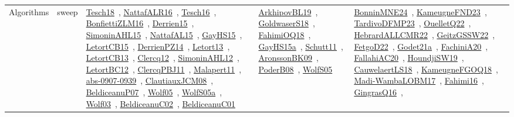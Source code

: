 {\begin{longtable}{lp{3cm}>{\raggedright\arraybackslash}p{6cm}>{\raggedright\arraybackslash}p{6cm}>{\raggedright\arraybackslash}p{8cm}}
\index{sweep}\index{Algorithms!sweep}Algorithms & sweep & \href{../works/Tesch18.pdf}{Tesch18}~\cite{Tesch18}, \href{../works/NattafALR16.pdf}{NattafALR16}~\cite{NattafALR16}, \href{../works/Tesch16.pdf}{Tesch16}~\cite{Tesch16}, \href{../works/BonfiettiZLM16.pdf}{BonfiettiZLM16}~\cite{BonfiettiZLM16}, \href{../works/Derrien15.pdf}{Derrien15}~\cite{Derrien15}, \href{../works/SimoninAHL15.pdf}{SimoninAHL15}~\cite{SimoninAHL15}, \href{../works/NattafAL15.pdf}{NattafAL15}~\cite{NattafAL15}, \href{../works/GayHS15.pdf}{GayHS15}~\cite{GayHS15}, \href{../works/LetortCB15.pdf}{LetortCB15}~\cite{LetortCB15}, \href{../works/DerrienPZ14.pdf}{DerrienPZ14}~\cite{DerrienPZ14}, \href{../works/Letort13.pdf}{Letort13}~\cite{Letort13}, \href{../works/LetortCB13.pdf}{LetortCB13}~\cite{LetortCB13}, \href{../works/Clercq12.pdf}{Clercq12}~\cite{Clercq12}, \href{../works/SimoninAHL12.pdf}{SimoninAHL12}~\cite{SimoninAHL12}, \href{../works/LetortBC12.pdf}{LetortBC12}~\cite{LetortBC12}, \href{../works/ClercqPBJ11.pdf}{ClercqPBJ11}~\cite{ClercqPBJ11}, \href{../works/Malapert11.pdf}{Malapert11}~\cite{Malapert11}, \href{../works/abs-0907-0939.pdf}{abs-0907-0939}~\cite{abs-0907-0939}, \href{../works/ClautiauxJCM08.pdf}{ClautiauxJCM08}~\cite{ClautiauxJCM08}, \href{../works/BeldiceanuP07.pdf}{BeldiceanuP07}~\cite{BeldiceanuP07}, \href{../works/Wolf05.pdf}{Wolf05}~\cite{Wolf05}, \href{../works/WolfS05a.pdf}{WolfS05a}~\cite{WolfS05a}, \href{../works/Wolf03.pdf}{Wolf03}~\cite{Wolf03}, \href{../works/BeldiceanuC02.pdf}{BeldiceanuC02}~\cite{BeldiceanuC02}, \href{../works/BeldiceanuC01.pdf}{BeldiceanuC01}~\cite{BeldiceanuC01} & \href{../works/ArkhipovBL19.pdf}{ArkhipovBL19}~\cite{ArkhipovBL19}, \href{../works/GoldwaserS18.pdf}{GoldwaserS18}~\cite{GoldwaserS18}, \href{../works/FahimiOQ18.pdf}{FahimiOQ18}~\cite{FahimiOQ18}, \href{../works/GayHS15a.pdf}{GayHS15a}~\cite{GayHS15a}, \href{../works/Schutt11.pdf}{Schutt11}~\cite{Schutt11}, \href{../works/AronssonBK09.pdf}{AronssonBK09}~\cite{AronssonBK09}, \href{../works/PoderB08.pdf}{PoderB08}~\cite{PoderB08}, \href{../works/WolfS05.pdf}{WolfS05}~\cite{WolfS05} & \href{../works/BonninMNE24.pdf}{BonninMNE24}~\cite{BonninMNE24}, \href{../works/KameugneFND23.pdf}{KameugneFND23}~\cite{KameugneFND23}, \href{../works/TardivoDFMP23.pdf}{TardivoDFMP23}~\cite{TardivoDFMP23}, \href{../works/OuelletQ22.pdf}{OuelletQ22}~\cite{OuelletQ22}, \href{../works/HebrardALLCMR22.pdf}{HebrardALLCMR22}~\cite{HebrardALLCMR22}, \href{../works/GeitzGSSW22.pdf}{GeitzGSSW22}~\cite{GeitzGSSW22}, \href{../works/FetgoD22.pdf}{FetgoD22}~\cite{FetgoD22}, \href{../works/Godet21a.pdf}{Godet21a}~\cite{Godet21a}, \href{../works/FachiniA20.pdf}{FachiniA20}~\cite{FachiniA20}, \href{../works/FallahiAC20.pdf}{FallahiAC20}~\cite{FallahiAC20}, \href{../works/HoundjiSW19.pdf}{HoundjiSW19}~\cite{HoundjiSW19}, \href{../works/CauwelaertLS18.pdf}{CauwelaertLS18}~\cite{CauwelaertLS18}, \href{../works/KameugneFGOQ18.pdf}{KameugneFGOQ18}~\cite{KameugneFGOQ18}, \href{../works/Madi-WambaLOBM17.pdf}{Madi-WambaLOBM17}~\cite{Madi-WambaLOBM17}, \href{../works/Fahimi16.pdf}{Fahimi16}~\cite{Fahimi16}, \href{../works/GingrasQ16.pdf}{GingrasQ16}~\cite{GingrasQ16}, 
\end{longtable}}
